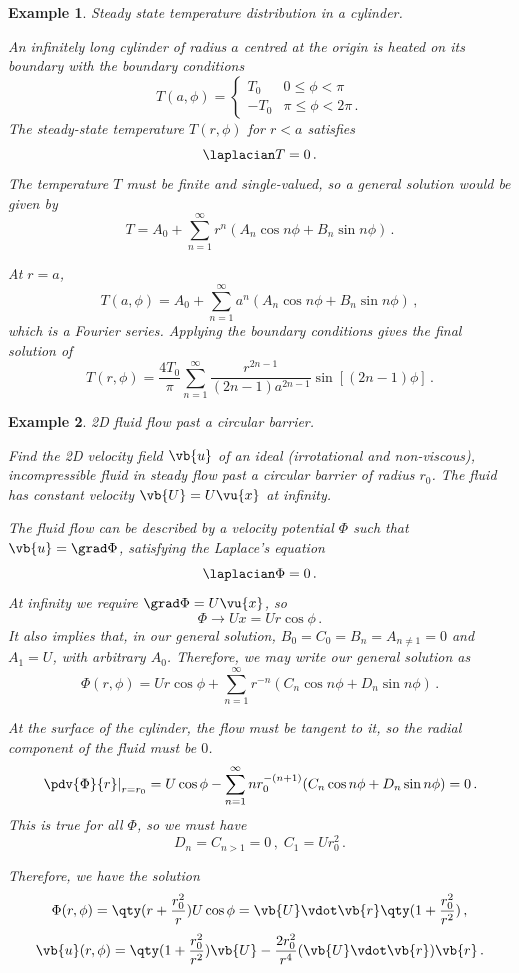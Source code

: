 \documentclass{article}
\theoremstyle{plain}\theoremheaderfont{\normalfont\itshape}\theorembodyfont{\rmfamily}\theoremseparator{.}\newtheorem*{rem}{Remark}\newtheorem*{ex}{Example}\newtheorem*{proof}{Proof}\newtheorem*{altp}{Alternative proof}
\theoremstyle{plain}\theoremheaderfont{\normalfont\bfseries}\theorembodyfont{\rmfamily}\theoremseparator{.}\newtheorem{thm}{Theorem}[section]\newtheorem{lem}[thm]{Lemma}\newtheorem{prop}[thm]{Proposition}\newtheorem*{cor}{Corollary}\newtheorem{defn}[thm]{Definition}\newtheorem{clm}[thm]{Claim}\newtheorem{clminproof}{Claim}
\theoremstyle{break}\theoremheaderfont{\normalfont\itshape}\theorembodyfont{\rmfamily}\theoremseparator{.\medskip}\newtheorem*{proofskip}{Proof}\newtheorem*{exs}{Examples}\newtheorem*{rems}{Remarks}
\theoremstyle{break}\theoremheaderfont{\normalfont\bfseries}\theorembodyfont{\rmfamily}\theoremseparator{.\medskip}\newtheorem{lemskip}[thm]{Lemma}\newtheorem{defnskip}[thm]{Definition}\newtheorem{propskip}[thm]{Proposition}\newtheorem{thmskip}[thm]{Theorem}
\numberwithin{equation}{section}
\begin{document}
	\begin{ex}
		\textit{Steady state temperature distribution in a cylinder.}
		
		An infinitely long cylinder of radius \(a\) centred at the origin is heated on its boundary with the boundary conditions
		\[T(a,\phi)=\begin{cases}
			T_0 & 0\le\phi< \pi\\
			-T_0 & \pi\le\phi<2\pi\,.
		\end{cases}\]
		The steady-state temperature \(T(r,\phi)\) for \(r<a\) satisfies
		\[\laplacian T=0\,.\]
		The temperature \(T\) must be finite and single-valued, so a general solution would be given by
		\[T=A_0+\sum_{n=1}^{\infty}r^n(A_n\cos n\phi+B_n\sin n\phi)\,.\]

		At \(r=a\),
		\[T(a,\phi)=A_0+\sum_{n=1}^{\infty}a^n(A_n\cos n\phi+B_n\sin n\phi)\,,\]
		which is a Fourier series. Applying the boundary conditions gives the final solution of
		\[T(r,\phi)=\frac{4T_0}{\pi}\sum_{n=1}^{\infty}\frac{r^{2n-1}}{(2n-1)a^{2n-1}}\sin[(2n-1)\phi]\,.\]
	\end{ex}
	\begin{ex}
		\textit{2D fluid flow past a circular barrier.}
		
		Find the 2D velocity field \(\vb{u}\) of an ideal (irrotational and non-viscous), incompressible fluid in steady flow past a circular barrier of radius \(r_0\). The fluid has constant velocity \(\vb{U}=U\vu{x}\) at infinity.

		The fluid flow can be described by a velocity potential \(\Phi\) such that \(\vb{u}=\grad\Phi\), satisfying the Laplace's equation
		\[\laplacian\Phi=0\,.\]
		At infinity we require \(\grad\Phi=U\vu{x}\), so
		\[\Phi\to Ux=Ur\cos\phi\,.\]
		It also implies that, in our general solution, \(B_0=C_0=B_n=A_{n\ne1}=0\) and \(A_1=U\), with arbitrary \(A_0\). Therefore, we may write our general solution as
		\[\Phi(r,\phi)=Ur\cos\phi+\sum_{n=1}^{\infty}r^{-n}(C_n\cos n\phi+D_n\sin n\phi)\,.\]

		At the surface of the cylinder, the flow must be tangent to it, so the radial component of the fluid must be \(0\).
		\[\left.\pdv{\Phi}{r}\right|_{r=r_0}=U\cos\phi-\sum_{n=1}^{\infty}nr_0^{-(n+1)}(C_n\cos n\phi+D_n\sin n\phi)=0\,.\]
		This is true for all \(\Phi\), so we must have
		\[D_n=C_{n>1}=0\,,\;C_1=Ur_0^2\,.\]

		Therefore, we have the solution
		\[\Phi(r,\phi)=\qty(r+\frac{r_0^2}{r})U\cos\phi=\vb{U}\vdot\vb{r}\qty(1+\frac{r_0^2}{r^2})\,,\]
		\[\vb{u}(r,\phi)=\qty(1+\frac{r_0^2}{r^2})\vb{U}-\frac{2r_0^2}{r^4}(\vb{U}\vdot\vb{r})\vb{r}\,.\]
	\end{ex}
\end{document}
